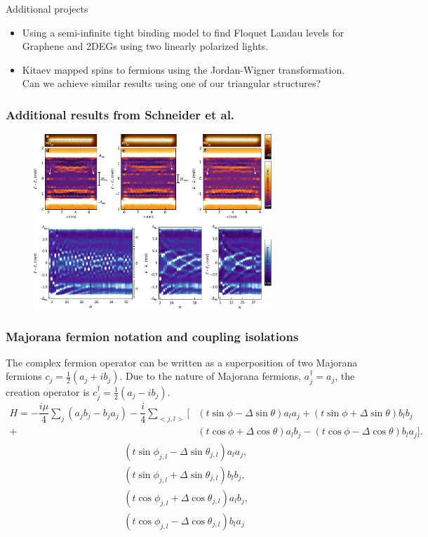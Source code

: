 \documentclass[xcolor=dvipsnames,10pt,aspectratio=169]{beamer}
\newcommand{\cc}{c^{\dagger}}
\newcommand{\de}{\Delta}
\begin{document}
  \begin{frame}{Additional projects}

    \begin{itemize}
      \item Using a semi-infinite tight binding model to find Floquet Landau levels for Graphene and 2DEGs using two linearly polarized lights.
      \item Kitaev mapped spins to fermions using the Jordan-Wigner transformation. Can we achieve similar results using one of our triangular structures?
    \end{itemize}
  \end{frame}

  \appendix

  \begin{frame}
    \frametitle{Additional results from Schneider et al.}

    \begin{figure}
      \includegraphics[width=0.8\textwidth]{./figures/Schneider-additional-results.pdf}
    \end{figure}

  \end{frame}

  \begin{frame}
  \frametitle{Majorana fermion notation and coupling isolations}
    The complex fermion operator can be written as a superposition of two Majorana fermions $c_j = \frac{1}{2} (a_j + i b_j)$.
    Due to the nature of Majorana fermions, $a^{\dagger}_j = a_j$, the creation operator is $\cc_j = \frac{1}{2} (a_j - i b_j)$.
    \begin{align*}
      H = -\dfrac{i\mu}{4} \sum_j (a_j b_j - b_j a_j) - \dfrac{i}{4} \sum_{<j,l>} [&(t\sin\phi-\de\sin\theta) a_l a_j + (t\sin\phi+\de\sin\theta) b_l b_j \nonumber \\
      +&(t\cos\phi+\de\cos\theta) a_l b_j - (t\cos\phi-\de\cos\theta) b_l a_j].
    \end{align*}
    \begin{align}
      &(t \sin\phi_{j,l} - \de \sin\theta_{j,l}) a_l a_j, \\
      &(t \sin\phi_{j,l} + \de \sin\theta_{j,l}) b_l b_j, \\
      &(t \cos\phi_{j,l} + \de \cos\theta_{j,l}) a_l b_j, \\
      &(t \cos\phi_{j,l} - \de \cos\theta_{j,l}) b_l a_j
    \end{align}
  \end{frame}
\end{document}
